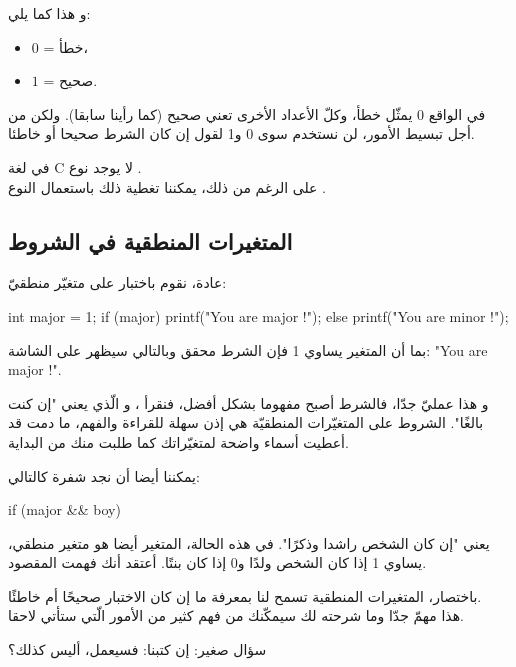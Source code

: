 و هذا كما يلي:

\begin{itemize}
	\item $ 0 $ = خطأ،
	\item $ 1 $ = صحيح.
\end{itemize}

في الواقع 0 يمثّل خطأ، وكلّ الأعداد الأخرى تعني صحيح (كما رأينا سابقا). ولكن من أجل تبسيط الأمور، لن نستخدم سوى 0 و1 لقول إن كان الشرط صحيحا أو خاطئا.

في لغة
\textenglish{C}
 لا يوجد نوع
.\\
على الرغم من ذلك، يمكننا تغطية ذلك باستعمال النوع
.

\subsection{المتغيرات المنطقية في الشروط}

عادة، نقوم باختبار
على متغيّر منطقيّ:

\begin{Csource}
int major = 1;
if (major)
{
	printf("You are major !");
}
else {
	printf("You are minor !");
}
\end{Csource}

بما أن المتغير
يساوي 1 فإن الشرط محقق وبالتالي سيظهر على الشاشة:
"\textenglish{You are major !}".

و هذا عمليّ جدّا، فالشرط أصبح مفهوما بشكل أفضل، فنقرأ
،
و الّذي يعني "إن كنت بالغًا". الشروط على المتغيّرات المنطقيّة هي إذن سهلة للقراءة والفهم، ما دمت قد أعطيت أسماء واضحة لمتغيّراتك كما طلبت منك من البداية.

يمكننا أيضا أن نجد شفرة كالتالي:

\begin{Csource}
if (major && boy)
\end{Csource}

يعني "إن كان الشخص راشدا وذكرًا". في هذه الحالة، المتغير 
أيضا هو متغير منطقي، يساوي 1 إذا كان الشخص ولدًا و0 إذا كان بنتًا. أعتقد أنك فهمت المقصود.

باختصار، المتغيرات المنطقية تسمح لنا بمعرفة ما إن كان الاختبار صحيحًا أم خاطئًا.\\
هذا مهمّ جدّا وما شرحته لك سيمكّنك من فهم كثير من الأمور الّتي ستأتي لاحقا.

\begin{question}
سؤال صغير: إن كتبنا:
فسيعمل، أليس كذلك؟
\end{question}

